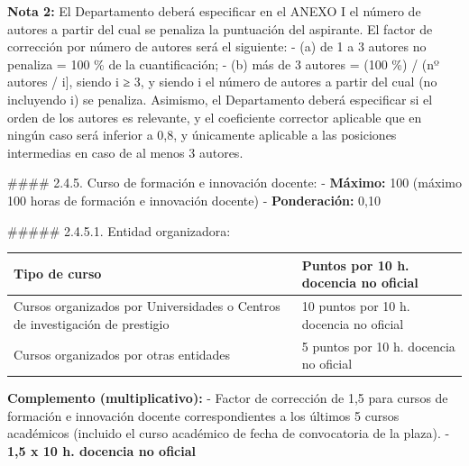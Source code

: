 \documentclass{article}
\begin{document}
\begin{itemize}
\begin{itemize}
\begin{scriptsize}
                  \textbf{Nota 2:} El Departamento deberá especificar en el ANEXO I el número de autores a partir del cual se penaliza la puntuación del aspirante. El factor de corrección por número de autores será el siguiente:
                  - (a) de 1 a 3 autores no penaliza = 100 \% de la cuantificación;
                  - (b) más de 3 autores = (100 \%) / (nº autores / i], siendo i ≥ 3, y siendo i el número de autores a partir del cual (no incluyendo i) se penaliza. Asimismo, el Departamento deberá especificar si el orden de los autores es relevante, y el coeficiente corrector aplicable que en ningún caso será inferior a 0,8, y únicamente aplicable a las posiciones intermedias en caso de al menos 3 autores.

                  \#\#\#\# 2.4.5. Curso de formación e innovación docente:
                  - \textbf{Máximo:} 100 (máximo 100 horas de formación e innovación docente)
                  - \textbf{Ponderación:} 0,10

                  \#\#\#\#\# 2.4.5.1. Entidad organizadora:
                  \vspace{0.4cm}
                  \begin{table}[h!]\centering\renewcommand{\arraystretch}{1.3}
                    \begin{tabular}{|p{}|p{}|}\hline
                      Tipo de curso                                                                & Puntos por 10 h. docencia no oficial    \\\hline
                      Cursos organizados por Universidades o Centros de investigación de prestigio & 10 puntos por 10 h. docencia no oficial \\\hline
                      Cursos organizados por otras entidades                                       & 5 puntos por 10 h. docencia no oficial  \\\hline
                    \end{tabular}\end{table}
                  \vspace{0.4cm}

                  \textbf{Complemento (multiplicativo):}
                  - Factor de corrección de 1,5 para cursos de formación e innovación docente correspondientes a los últimos 5 cursos académicos (incluido el curso académico de fecha de convocatoria de la plaza).
                  - \textbf{1,5 x 10 h. docencia no oficial}
                \end{scriptsize}
        \end{itemize}



\end{itemize}
\end{document}
